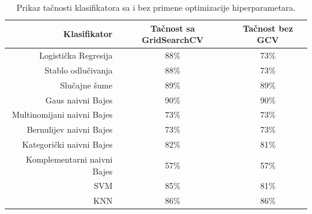 \documentclass[fontsize=12bp, paper=a4]{scrarticle}
\begin{document}
\begin{table}[h]
    \centering
    \begin{tabular}{|r|c|c|}
    \hline
    \textbf{Klasifikator} & \textbf{Tačnost sa GridSearchCV} & \textbf{Tačnost bez GCV} \\
    \hline
    Logistička Regresija & 88\% & 73\% \\
    \hline
    Stablo odlučivanja & 88\% & 73\% \\
    \hline
    Slučajne šume & 89\% & 89\% \\ 
    \hline
    Gaus naivni Bajes & 90\% & 90\% \\ 
    \hline
    Multinomijani naivni Bajes & 73\% & 73\% \\ 
    \hline
    Bernulijev naivni Bajes & 73\% & 73\% \\ 
    \hline
    Kategorički naivni Bajes & 82\% & 81\% \\ 
    \hline
    Komplementarni naivni Bajes & 57\% & 57\% \\ 
    \hline
    SVM & 85\% & 81\% \\ 
    \hline
    KNN & 86\% & 86\% \\ 
    \hline
    \end{tabular}
    \caption{Prikaz tačnosti klasifikatora sa i bez primene optimizacije hiperparametara.} 
\end{table}







\end{document}
